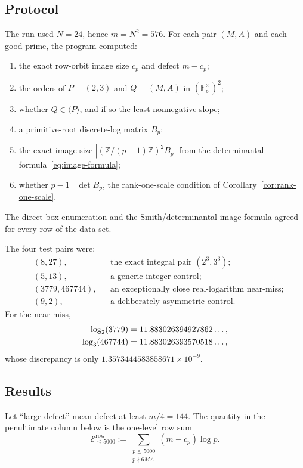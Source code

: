\documentclass[11pt]{article}
\theoremstyle{definition}
\theoremstyle{remark}
\newcommand{\Z}{\mathbb Z}
\newcommand{\F}{\mathbb F}
\begin{document}
\subsection{Protocol}

The run used $N=24$, hence $m=N^2=576$.  For each pair $(M,A)$ and each good prime, the program computed:
\begin{enumerate}[label=\textup{(\roman*)}]
\item the exact row-orbit image size $c_p$ and defect $m-c_p$;
\item the orders of $P=(2,3)$ and $Q=(M,A)$ in $(\F_p^\times)^2$;
\item whether $Q\in\langle P\rangle$, and if so the least nonnegative slope;
\item a primitive-root discrete-log matrix $B_p$;
\item the exact image size $|(\Z/(p-1)\Z)^2B_p|$ from the determinantal formula~\eqref{eq:image-formula};
\item whether $p-1\mid\det B_p$, the rank-one-scale condition of Corollary~\ref{cor:rank-one-scale}.
\end{enumerate}
The direct box enumeration and the Smith/determinantal image formula agreed for every row of the data set.

The four test pairs were:
\begin{align*}
 &(8,27), &&\text{the exact integral pair }(2^3,3^3);\\
 &(5,13), &&\text{a generic integer control};\\
 &(3779,467744), &&\text{an exceptionally close real-logarithm near-miss};\\
 &(9,2), &&\text{a deliberately asymmetric control}.
\end{align*}
For the near-miss,
\begin{align}
 \log_2(3779)&=11.883026394927862\ldots,\notag\\
 \log_3(467744)&=11.883026393570518\ldots,
 \label{eq:near-miss}
\end{align}
whose discrepancy is only
$1.3573444583858671\times10^{-9}$.

\subsection{Results}

Let ``large defect'' mean defect at least $m/4=144$.  The quantity in the penultimate column below is the one-level row sum
\[
 \mathscr E_{\le5000}^{\mathrm{row}}
 :=\sum_{\substack{p\le5000\\p\nmid6MA}}(m-c_p)\log p.
\]
\end{document}
